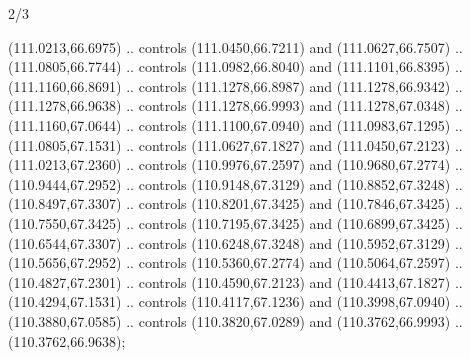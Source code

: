 \begin{flagdescription}{2/3}
\begin{scope}[shift={(0.5\flaglength,0.5)},scale=\flagwidth/320]
\begin{scope}[y=0.8pt, x=0.8pt, yscale=-1,shift={(-118.3,-146)}]
  (111.0213,66.6975) .. controls (111.0450,66.7211) and (111.0627,66.7507) ..
  (111.0805,66.7744) .. controls (111.0982,66.8040) and (111.1101,66.8395) ..
  (111.1160,66.8691) .. controls (111.1278,66.8987) and (111.1278,66.9342) ..
  (111.1278,66.9638) .. controls (111.1278,66.9993) and (111.1278,67.0348) ..
  (111.1160,67.0644) .. controls (111.1100,67.0940) and (111.0983,67.1295) ..
  (111.0805,67.1531) .. controls (111.0627,67.1827) and (111.0450,67.2123) ..
  (111.0213,67.2360) .. controls (110.9976,67.2597) and (110.9680,67.2774) ..
  (110.9444,67.2952) .. controls (110.9148,67.3129) and (110.8852,67.3248) ..
  (110.8497,67.3307) .. controls (110.8201,67.3425) and (110.7846,67.3425) ..
  (110.7550,67.3425) .. controls (110.7195,67.3425) and (110.6899,67.3425) ..
  (110.6544,67.3307) .. controls (110.6248,67.3248) and (110.5952,67.3129) ..
  (110.5656,67.2952) .. controls (110.5360,67.2774) and (110.5064,67.2597) ..
  (110.4827,67.2301) .. controls (110.4590,67.2123) and (110.4413,67.1827) ..
  (110.4294,67.1531) .. controls (110.4117,67.1236) and (110.3998,67.0940) ..
  (110.3880,67.0585) .. controls (110.3820,67.0289) and (110.3762,66.9993) ..
  (110.3762,66.9638);


\end{scope}
\end{scope}
\end{flagdescription}
